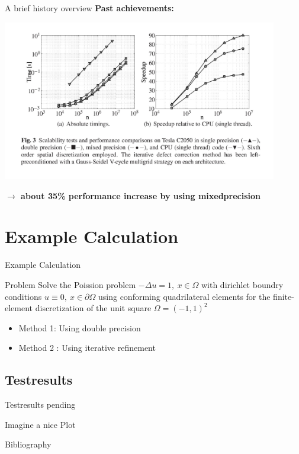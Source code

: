 \documentclass[10pt]{beamer}
\begin{document}
\begin{frame}{A brief history overview}
 \textbf{Past achievements:}~\\
\begin{center}
  \includegraphics[width=0.9\textwidth]{../SourcesCites/past.jpg}
  \cite{WaterWaveComp}
\end{center}
\textbf{$\rightarrow$ about 35\% performance increase by using mixedprecision}
\end{frame}


\section{Example Calculation}
\begin{frame}{Example Calculation}
\begin{block}{Problem}
Solve the Poission problem $- \Delta u = 1,~x\in\Omega$ with dirichlet boundry conditions $u \equiv 0,~x\in \partial \Omega$ using conforming quadrilateral 
elements for the finite-element discretization of the unit square $\Omega = (-1,1)^2$
\end{block}

\begin{itemize}
\item Method 1: Using double precision
\item Method 2 : Using iterative refinement
\end{itemize}
\end{frame}



\subsection{Testresults}
\begin{frame}{Testresults pending}
\begin{center}
\color{red} Imagine a nice Plot\color{black}
\end{center}
\end{frame}
\begin{frame}{Bibliography}
   
\end{frame}
\end{document}
